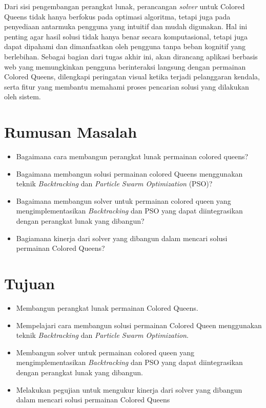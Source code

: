 \documentclass[a4paper,twoside]{article}
\begin{document}
	
	Dari sisi pengembangan perangkat lunak, perancangan \textit{solver} untuk Colored Queens tidak hanya berfokus pada optimasi algoritma, tetapi juga pada penyediaan antarmuka pengguna yang intuitif dan mudah digunakan. Hal ini penting agar hasil solusi tidak hanya benar secara komputasional, tetapi juga dapat dipahami dan dimanfaatkan oleh pengguna tanpa beban kognitif yang berlebihan. Sebagai bagian dari tugas akhir ini, akan dirancang aplikasi berbasis web yang memungkinkan pengguna berinteraksi langsung dengan permainan Colored Queens, dilengkapi peringatan visual ketika terjadi pelanggaran kendala, serta fitur yang membantu memahami proses pencarian solusi yang dilakukan oleh sistem.
	
	\section{Rumusan Masalah}
	\begin{itemize}	
		\item Bagaimana cara membangun perangkat lunak permainan colored queens?
		
		\item Bagaimana membangun solusi permainan colored Queens menggunakan teknik \textit{Backtracking} dan \textit{Particle Swarm Optimization} (PSO)?
		
		\item Bagaimana membangun solver untuk permainan colored queen yang mengimplementasikan \textit{Backtracking} dan PSO yang dapat diintegrasikan dengan perangkat lunak yang dibangun?
		
		\item Bagiamana kinerja dari solver yang dibangun dalam mencari solusi permainan Colored Queens?
	\end{itemize}
	
	\section{Tujuan}
	\begin{itemize}	
		\item Membangun perangkat lunak permainan Colored Queens.
		
		\item Mempelajari cara membangun solusi permainan Colored Queen menggunakan teknik \textit{Backtracking} dan \textit{Particle Swarm Optimization}.
		
		\item Membangun solver untuk permainan colored queen yang mengimplementasikan \textit{Backtracking} dan PSO yang dapat diintegrasikan dengan perangkat lunak yang dibangun.
		
		\item Melakukan pegujian untuk mengukur kinerja dari solver yang dibangun dalam mencari solusi permainan Colored Queens
	\end{itemize}
	
\end{document}
